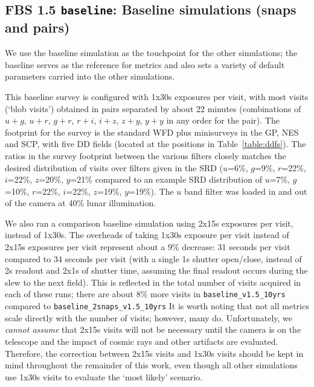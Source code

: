 
\subsection{FBS 1.5 {\tt baseline}: Baseline simulations (snaps and pairs)}\label{ss:baseline}

We use the baseline simulation as the touchpoint for the other simulations; the baseline serves as the reference for metrics and also sets a variety of default parameters carried into the other simulations. 

This baseline survey is configured with 1x30s exposures per visit, with most visits (`blob visits') obtained in pairs separated by about 22 minutes (combinations of $u+g$, $u+r$, $g+r$, $r+i$, $i+z$, $z+y$, $y+y$ in any order for the pair). The footprint for the survey is the standard WFD plus minisurveys in the GP, NES and SCP, with five DD fields (located at the positions in Table~\ref{table:ddfs}). The ratios in the survey footprint between the various filters closely matches the desired distribution of visits over filters given in the SRD ($u$=6\%, $g$=9\%, $r$=22\%, $i$=22\%, $z$=20\%, $y$=21\% compared to an example SRD distribution of $u$=7\%, $g$=10\%, $r$=22\%, $i$=22\%, $z$=19\%, $y$=19\%). The $u$ band filter was loaded in and out of the camera at 40\% lunar illumination. 

We also ran a comparison baseline simulation using 2x15s exposures per visit, instead of 1x30s. The overheads of taking 1x30s exposure per visit instead of 2x15s exposures per visit represent about a 9\% decrease: 31 seconds per visit compared to 34 seconds per visit (with a single 1s shutter open/close, instead of 2s readout and 2x1s of shutter time, assuming the final readout occurs during the slew to the next field). This is reflected in the total number of visits acquired in each of these runs; there are about 8\% more visits in {\tt baseline\_v1.5\_10yrs} compared to {\tt baseline\_2snaps\_v1.5\_10yrs} It is worth noting that not all metrics scale directly with the number of visits; however, many do. Unfortunately, we {\it cannot assume} that 2x15s visits will not be necessary until the camera is on the telescope and the impact of cosmic rays and other artifacts are evaluated. Therefore, the correction between 2x15s visits and 1x30s visits should be kept in mind throughout the remainder of this work, even though all other simulations use 1x30s visits to evaluate the `most likely' scenario. 

